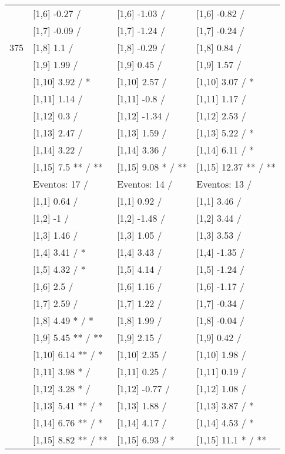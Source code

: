 \begin{table}
\begin{tabular}[t]{llll}
 & {}[1,6] -0.27  / & {}[1,6] -1.03  / & {}[1,6] -0.82  /\\
 & {}[1,7] -0.09  / & {}[1,7] -1.24  / & {}[1,7] -0.24  /\\
375 & {}[1,8] 1.1  / & {}[1,8] -0.29  / & {}[1,8] 0.84  /\\
\addlinespace
 & {}[1,9] 1.99  / & {}[1,9] 0.45  / & {}[1,9] 1.57  /\\
 & {}[1,10] 3.92  / * & {}[1,10] 2.57  / & {}[1,10] 3.07  / *\\
 & {}[1,11] 1.14  / & {}[1,11] -0.8  / & {}[1,11] 1.17  /\\
 & {}[1,12] 0.3  / & {}[1,12] -1.34  / & {}[1,12] 2.53  /\\
 & {}[1,13] 2.47  / & {}[1,13] 1.59  / & {}[1,13] 5.22  / *\\
\addlinespace
 & {}[1,14] 3.22  / & {}[1,14] 3.36  / & {}[1,14] 6.11  / *\\
 & {}[1,15] 7.5 ** / ** & {}[1,15] 9.08 * / ** & {}[1,15] 12.37 ** / **\\
 & Eventos:  17 / & Eventos:  14 / & Eventos:  13 /\\
 & {}[1,1] 0.64  / & {}[1,1] 0.92  / & {}[1,1] 3.46  /\\
 & {}[1,2] -1  / & {}[1,2] -1.48  / & {}[1,2] 3.44  /\\
\addlinespace
 & {}[1,3] 1.46  / & {}[1,3] 1.05  / & {}[1,3] 3.53  /\\
 & {}[1,4] 3.41  / * & {}[1,4] 3.43  / & {}[1,4] -1.35  /\\
 & {}[1,5] 4.32  / * & {}[1,5] 4.14  / & {}[1,5] -1.24  /\\
 & {}[1,6] 2.5  / & {}[1,6] 1.16  / & {}[1,6] -1.17  /\\
 & {}[1,7] 2.59  / & {}[1,7] 1.22  / & {}[1,7] -0.34  /\\
\addlinespace
500 & {}[1,8] 4.49 * / * & {}[1,8] 1.99  / & {}[1,8] -0.04  /\\
 & {}[1,9] 5.45 ** / ** & {}[1,9] 2.15  / & {}[1,9] 0.42  /\\
 & {}[1,10] 6.14 ** / * & {}[1,10] 2.35  / & {}[1,10] 1.98  /\\
 & {}[1,11] 3.98 * / & {}[1,11] 0.25  / & {}[1,11] 0.19  /\\
 & {}[1,12] 3.28 * / & {}[1,12] -0.77  / & {}[1,12] 1.08  /\\
\addlinespace
 & {}[1,13] 5.41 ** / * & {}[1,13] 1.88  / & {}[1,13] 3.87  / *\\
 & {}[1,14] 6.76 ** / * & {}[1,14] 4.17  / & {}[1,14] 4.53  / *\\
 & {}[1,15] 8.82 ** / ** & {}[1,15] 6.93  / * & {}[1,15] 11.1 * / **\\
\bottomrule
\end{tabular}
\end{table}
